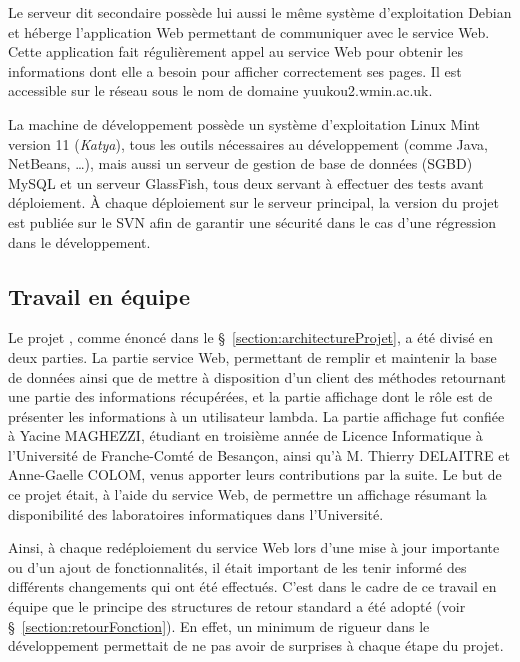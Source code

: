 Le serveur dit {\og}secondaire{\fg} poss\`ede lui aussi le m\^eme syst\`eme d'exploitation Debian et h\'eberge l'application Web permettant de communiquer avec le service Web.
Cette application fait r\'eguli\`erement appel au service Web pour obtenir les informations dont elle a besoin pour afficher correctement ses pages.
Il est accessible sur le r\'eseau sous le nom de domaine \textsf{yuukou2.wmin.ac.uk}.

La machine de d\'eveloppement poss\`ede un syst\`eme d'exploitation Linux Mint version 11 (\textit{Katya}), tous les outils n\'ecessaires au d\'eveloppement (comme Java, NetBeans, \ldots), mais aussi un serveur de gestion de base de donn\'ees (SGBD) MySQL et un serveur GlassFish, tous deux servant \`a effectuer des tests avant d\'eploiement.
\`A chaque d\'eploiement sur le serveur principal, la version du projet est publi\'ee sur le SVN afin de garantir une s\'ecurit\'e dans le cas d'une r\'egression dans le d\'eveloppement.

\subsection{Travail en \'equipe}
\label{section:travailequipe}

Le projet {\YuukouII}, comme \'enonc\'e dans le \S~\ref{section:architectureProjet}, a \'et\'e divis\'e en deux parties.
La partie service Web, permettant de remplir et maintenir la base de donn\'ees ainsi que de mettre \`a disposition d'un client des m\'ethodes retournant une partie des informations r\'ecup\'er\'ees, et la partie affichage dont le r\^ole est de pr\'esenter les informations \`a un utilisateur lambda.
La partie affichage fut confi\'ee \`a Yacine MAGHEZZI, \'etudiant en troisi\`eme ann\'ee de Licence Informatique \`a l'Universit\'e de Franche-Comt\'e de Besan\c{c}on, ainsi qu'\`a M. Thierry DELAITRE et Anne-Gaelle COLOM, venus apporter leurs contributions par la suite.
Le but de ce projet \'etait, \`a l'aide du service Web, de permettre un affichage r\'esumant la disponibilit\'e des laboratoires informatiques dans l'Universit\'e.

Ainsi, \`a chaque red\'eploiement du service Web lors d'une mise \`a jour importante ou d'un ajout de fonctionnalit\'es, il \'etait important de les tenir inform\'e des diff\'erents changements qui ont \'et\'e effectu\'es.
C'est dans le cadre de ce travail en \'equipe que le principe des structures de retour standard a \'et\'e adopt\'e (voir \S~\ref{section:retourFonction}).
En effet, un minimum de rigueur dans le d\'eveloppement permettait de ne pas avoir de surprises \`a chaque \'etape du projet.


